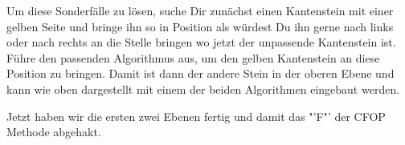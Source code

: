 Um diese Sonderfälle zu lösen, suche Dir zunächst einen Kantenstein mit einer
gelben Seite und bringe ihn so in Position als würdest Du ihn gerne nach links
oder nach rechts an die Stelle bringen wo jetzt der unpassende Kantenstein ist.
Führe den passenden Algorithmus aus, um den gelben Kantenstein an diese Position
zu bringen. Damit ist dann der andere Stein in der oberen Ebene und kann wie
oben dargestellt mit einem der beiden Algorithmen eingebaut werden.

Jetzt haben wir die ersten zwei Ebenen fertig und damit das "'F"' der CFOP Methode abgehakt.

